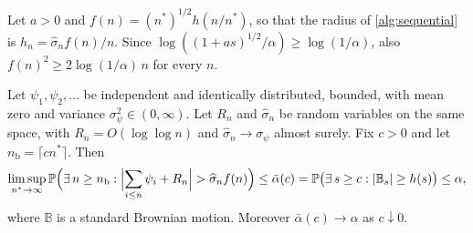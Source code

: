 Let $a>0$ and $f(n)=(n^\ast)^{1/2}h(n/n^\ast)$, so that the radius of \cref{alg:sequential} is $h_n=\widehat\sigma_nf(n)/n$. Since $\log((1+as)^{1/2}/\alpha)\ge\log(1/\alpha)$, also $f(n)^2\ge2\log(1/\alpha)\,n$ for every $n$.

\begin{lemma}\label{lem:seq-crossing}
Let $\psi_1,\psi_2,\dots$ be independent and identically distributed, bounded, with mean zero and variance $\sigma^2_\psi\in(0,\infty)$. Let $R_n$ and $\widehat\sigma_n$ be random variables on the same space, with $R_n=O(\log\log n)$ and $\widehat\sigma_n\to\sigma_\psi$ almost surely. Fix $c>0$ and let $n_{\mathrm b}=\lceil cn^\ast\rceil$. Then
\[
  \limsup_{n^\ast\to\infty}\Pr\Bigl(\exists\,n\ge n_{\mathrm b}:\Bigl|\sum_{i\le n}\psi_i+R_n\Bigr|>\widehat\sigma_nf(n)\Bigr)\le\bar\alpha(c)=\Pr\bigl(\exists\,s\ge c:|\mathbb B_s|\ge h(s)\bigr)\le\alpha,
\]
where $\mathbb B$ is a standard Brownian motion. Moreover $\bar\alpha(c)\to\alpha$ as $c\downarrow0$.
\end{lemma}

